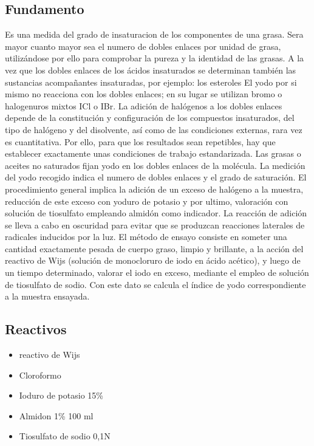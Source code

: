 \documentclass[a4paper,12pt]{article} %
\begin{document}
\subsection{Fundamento} 
Es una medida del grado de insaturacion de los componentes de una grasa. Sera mayor cuanto mayor sea el numero de dobles enlaces por unidad de grasa, utilizándose por ello para comprobar la pureza y la identidad de las grasas. A la vez que los dobles enlaces de los ácidos insaturados se determinan también las sustancias acompañantes insaturadas, por ejemplo: los esteroles
El yodo por si mismo no reacciona con los dobles enlaces; en su lugar se utilizan bromo o halogenuros mixtos ICl o IBr. La adición de halógenos a los dobles enlaces depende de la constitución y configuración de los compuestos insaturados, del tipo de halógeno y del disolvente, así como de las condiciones externas, rara vez es cuantitativa. Por ello, para que los resultados sean repetibles, hay que establecer  exactamente unas condiciones de trabajo estandarizada.
Las grasas o aceites no saturados fijan yodo en los dobles enlaces de la molécula. La medición del yodo recogido indica el numero de dobles enlaces y el grado de saturación. El procedimiento general implica la adición de un exceso de halógeno a la muestra, reducción de este exceso con yoduro de potasio y por ultimo, valoración con solución de tiosulfato empleando almidón como indicador. La reacción de adición se lleva a cabo en oscuridad para evitar que se produzcan reacciones laterales de radicales inducidos por la luz.
El método de ensayo consiste en someter una cantidad exactamente pesada de cuerpo graso, limpio y brillante, a la acción del reactivo de Wijs (solución de monocloruro de iodo en ácido acético), y luego de un tiempo determinado, valorar el iodo en exceso, mediante el empleo de solución de tiosulfato de sodio. Con este dato se calcula el índice de yodo correspondiente a la muestra ensayada.
\subsection{Reactivos} 
\begin{itemize}
    \item{reactivo de Wijs}
    \item{Cloroformo}
    \item{Ioduro de potasio 15\%}
    \item{Almidon 1\% 100 ml}
    \item{Tiosulfato de sodio 0,1N}
    
\end{itemize}
\end{document}
